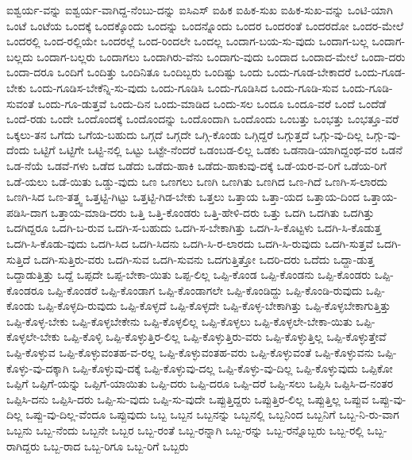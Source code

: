{ಐಶ್ವರ್ಯ-ವನ್ನು
ಐಶ್ವರ್ಯ-ವಾಗಿದ್ದ-ನೆಂಬು-ದನ್ನು
ಐಸಿಎಸ್
ಐಹಿಕ
ಐಹಿಕ-ಸುಖ
ಐಹಿಕ-ಸುಖ-ವನ್ನು
ಒಂಟಿ-ಯಾಗಿ
ಒಂಟೆ
ಒಂಟೆಯ
ಒಂದಕ್ಕೆ
ಒಂದಕ್ಕೊಂದು
ಒಂದನ್ನು
ಒಂದನ್ನೊಂದು
ಒಂದರ
ಒಂದರಂತೆ
ಒಂದರದೋ
ಒಂದರ-ಮೇಲೆ
ಒಂದರಲ್ಲಿ
ಒಂದ-ರಲ್ಲಿಯೇ
ಒಂದರಲ್ಲೆ
ಒಂದ-ರಿಂದಲೇ
ಒಂದಲ್ಲ
ಒಂದಾಗ-ಬಯ-ಸು-ವುದು
ಒಂದಾಗ-ಬಲ್ಲ
ಒಂದಾಗ-ಬಲ್ಲದು
ಒಂದಾಗ-ಬಲ್ಲರು
ಒಂದಾಗಲು
ಒಂದಾಗಿರು-ವೆನು
ಒಂದಾಗು-ವುದು
ಒಂದಾದ
ಒಂದಾದ-ಮೇಲೆ
ಒಂದಾ-ದರು
ಒಂದಾ-ದರೂ
ಒಂದಿಗೆ
ಒಂದಿತ್ತು
ಒಂದಿನಿತೂ
ಒಂದಿಬ್ಬರು
ಒಂದಿಷ್ಟು
ಒಂದು
ಒಂದು-ಗೂಡ-ಬೇಕಾದರೆ
ಒಂದು-ಗೂಡ-ಬೇಕು
ಒಂದು-ಗೂಡಿಸ-ಬೇಕೆನ್ನಿ-ಸು-ವುದು
ಒಂದು-ಗೂಡಿಸಿ
ಒಂದು-ಗೂಡಿಸಿದ
ಒಂದು-ಗೂಡಿ-ಸುವ
ಒಂದು-ಗೂಡಿ-ಸುವಂತೆ
ಒಂದು-ಗೂ-ಡುತ್ತವೆ
ಒಂದು-ದಿನ
ಒಂದು-ಮಾಡಿದ
ಒಂದು-ಸಲ
ಒಂದೂ
ಒಂದೂ-ವರೆ
ಒಂದೆ
ಒಂದೆಡೆ
ಒಂದೆ-ರಡು
ಒಂದೇ
ಒಂದೊಂದಕ್ಕೆ
ಒಂದೊಂದನ್ನು
ಒಂದೊಂದಾಗಿ
ಒಂದೊಂದು
ಒಂಬತ್ತು
ಒಂಭತ್ತು
ಒಂಭತ್ತೂ-ವರೆ
ಒಕ್ಕಲು-ತನ
ಒಗೆದು
ಒಗೆಯ-ಬಹುದು
ಒಗ್ಗದೆ
ಒಗ್ಗದೇ
ಒಗ್ಗಿ-ಕೊಂಡು
ಒಗ್ಗಿದ್ದರೆ
ಒಗ್ಗುತ್ತದೆ
ಒಗ್ಗು-ವು-ದಿಲ್ಲ
ಒಗ್ಗು-ವು-ದೆಂದು
ಒಟ್ಟಿಗೆ
ಒಟ್ಟಿಗೇ
ಒಟ್ಟಿ-ನಲ್ಲಿ
ಒಟ್ಟು
ಒಟ್ಟೇ-ನೆಂದರೆ
ಒಡಂಬಡ-ಲಿಲ್ಲ
ಒಡಕು
ಒಡನಾಡಿ-ಯಾಗಿದ್ದಂಥ-ವರ
ಒಡನೆ
ಒಡ-ನೆಯೆ
ಒಡವೆ-ಗಳು
ಒಡೆದ
ಒಡೆದು
ಒಡೆದು-ಹಾಕಿ
ಒಡೆದು-ಹಾಕುವು-ದಕ್ಕೆ
ಒಡೆ-ಯರ-ವ-ರಿಗೆ
ಒಡೆಯ-ರಿಗೆ
ಒಡೆ-ಯಲು
ಒಡೆ-ಯಿತು
ಒಡ್ಡು-ವುದು
ಒಣ
ಒಣಗಲು
ಒಣಗಿ
ಒಣಗಿತು
ಒಣಗಿದ
ಒಣ-ಗಿದೆ
ಒಣಗಿ-ಸ-ಲಾರದು
ಒಣಗಿ-ಸಿದ
ಒಣ-ತತ್ತ್ವ
ಒತ್ತಟ್ಟಿ-ಗಿಟ್ಟು
ಒತ್ತಟ್ಟಿ-ಗಿಡ-ಬೇಕು
ಒತ್ತಲು
ಒತ್ತಾಯ
ಒತ್ತಾ-ಯದ
ಒತ್ತಾಯ-ದಿಂದ
ಒತ್ತಾಯ-ಪಡಿಸಿ-ದಾಗ
ಒತ್ತಾಯ-ಮಾಡಿ-ದರು
ಒತ್ತಿ
ಒತ್ತಿ-ಕೊಂಡರು
ಒತ್ತಿ-ಹೇಳಿ-ದರು
ಒತ್ತು
ಒದಗಿ
ಒದಗಿತು
ಒದಗಿತ್ತು
ಒದಗಿದ್ದರೂ
ಒದಗಿ-ಬ-ರುವ
ಒದಗಿ-ಸ-ಬಹುದು
ಒದಗಿ-ಸ-ಬೇಕಾಗಿತ್ತು
ಒದಗಿ-ಸಿ-ಕೊಟ್ಟಳು
ಒದಗಿ-ಸಿ-ಕೊಡುತ್ತ
ಒದಗಿ-ಸಿ-ಕೊಡು-ವುದು
ಒದಗಿ-ಸಿದ
ಒದಗಿ-ಸಿದನು
ಒದಗಿ-ಸಿ-ರ-ಲಾರದು
ಒದಗಿ-ಸಿ-ರುವುದು
ಒದಗಿ-ಸುತ್ತವೆ
ಒದಗಿ-ಸುತ್ತಿದೆ
ಒದಗಿ-ಸುತ್ತಿರು-ವರು
ಒದಗಿ-ಸುವ
ಒದಗಿ-ಸುವನು
ಒದಗುತ್ತಿತ್ತೋ
ಒದರಿ-ದರು
ಒದೆದು
ಒದ್ದಾ-ಡುತ್ತ
ಒದ್ದಾಡುತ್ತಿತ್ತು
ಒದ್ದೆ
ಒಪ್ಪದೇ
ಒಪ್ಪ-ಬೇಕಾ-ಯಿತು
ಒಪ್ಪ-ಲಿಲ್ಲ
ಒಪ್ಪಿ-ಕೊಂಡ
ಒಪ್ಪಿ-ಕೊಂಡನು
ಒಪ್ಪಿ-ಕೊಂಡರು
ಒಪ್ಪಿ-ಕೊಂಡರೂ
ಒಪ್ಪಿ-ಕೊಂಡರೆ
ಒಪ್ಪಿ-ಕೊಂಡಾಗ
ಒಪ್ಪಿ-ಕೊಂಡಾಗಲೇ
ಒಪ್ಪಿ-ಕೊಂಡಿದ್ದು
ಒಪ್ಪಿ-ಕೊಂಡಿ-ರುವುದು
ಒಪ್ಪಿ-ಕೊಂಡು
ಒಪ್ಪಿ-ಕೊಳ್ಳದಿ-ರುವುದು
ಒಪ್ಪಿ-ಕೊಳ್ಳದೆ
ಒಪ್ಪಿ-ಕೊಳ್ಳದೇ
ಒಪ್ಪಿ-ಕೊಳ್ಳ-ಬೇಕಾಗಿತ್ತು
ಒಪ್ಪಿ-ಕೊಳ್ಳಬೇಕಾಗುತ್ತಿತ್ತು
ಒಪ್ಪಿ-ಕೊಳ್ಳ-ಬೇಕು
ಒಪ್ಪಿ-ಕೊಳ್ಳಬೇಕೇನು
ಒಪ್ಪಿ-ಕೊಳ್ಳಲಿಲ್ಲ
ಒಪ್ಪಿ-ಕೊಳ್ಳಲು
ಒಪ್ಪಿ-ಕೊಳ್ಳಲೇ-ಬೇಕಾ-ಯಿತು
ಒಪ್ಪಿ-ಕೊಳ್ಳಲೇ-ಬೇಕು
ಒಪ್ಪಿ-ಕೊಳ್ಳಿ
ಒಪ್ಪಿ-ಕೊಳ್ಳುತ್ತಿರ-ಲಿಲ್ಲ
ಒಪ್ಪಿ-ಕೊಳ್ಳುತ್ತಿರು-ವರು
ಒಪ್ಪಿ-ಕೊಳ್ಳುತ್ತಿಲ್ಲ
ಒಪ್ಪಿ-ಕೊಳ್ಳುತ್ತೇವೆ
ಒಪ್ಪಿ-ಕೊಳ್ಳುವ
ಒಪ್ಪಿ-ಕೊಳ್ಳುವಂತಹ-ವ-ರಲ್ಲ
ಒಪ್ಪಿ-ಕೊಳ್ಳುವಂತಹ-ವರು
ಒಪ್ಪಿ-ಕೊಳ್ಳುವಂತೆ
ಒಪ್ಪಿ-ಕೊಳ್ಳುವನು
ಒಪ್ಪಿ-ಕೊಳ್ಳು-ವು-ದಕ್ಕಾಗಿ
ಒಪ್ಪಿ-ಕೊಳ್ಳುವು-ದಕ್ಕೆ
ಒಪ್ಪಿ-ಕೊಳ್ಳುವು-ದಲ್ಲ
ಒಪ್ಪಿ-ಕೊಳ್ಳು-ವು-ದಿಲ್ಲ
ಒಪ್ಪಿ-ಕೊಳ್ಳುವುದು
ಒಪ್ಪಿಕೋ
ಒಪ್ಪಿಗೆ
ಒಪ್ಪಿಗೆ-ಯನ್ನು
ಒಪ್ಪಿಗೆ-ಯಾಯಿತು
ಒಪ್ಪಿ-ದರು
ಒಪ್ಪಿ-ದರೂ
ಒಪ್ಪಿ-ದರೆ
ಒಪ್ಪಿ-ಸಲು
ಒಪ್ಪಿಸಿ
ಒಪ್ಪಿಸಿ-ದ-ನಂತರ
ಒಪ್ಪಿಸಿ-ದನು
ಒಪ್ಪಿಸಿ-ದರು
ಒಪ್ಪಿ-ಸು-ವುದು
ಒಪ್ಪಿ-ಸು-ವುದೇ
ಒಪ್ಪುತ್ತಿದ್ದರು
ಒಪ್ಪುತ್ತಿರ-ಲಿಲ್ಲ
ಒಪ್ಪುತ್ತಿಲ್ಲ
ಒಪ್ಪುವ
ಒಪ್ಪು-ವು-ದಿಲ್ಲ
ಒಪ್ಪು-ವು-ದಿಲ್ಲ-ವೆಂದೂ
ಒಪ್ಪುವುದು
ಒಬ್ಬ
ಒಬ್ಬನ
ಒಬ್ಬನನ್ನು
ಒಬ್ಬನಲ್ಲಿ
ಒಬ್ಬನಿಂದ
ಒಬ್ಬನಿಗೆ
ಒಬ್ಬ-ನಿ-ರು-ವಾಗ
ಒಬ್ಬನು
ಒಬ್ಬ-ನೆಂದು
ಒಬ್ಬನೇ
ಒಬ್ಬರ
ಒಬ್ಬ-ರಂತೆ
ಒಬ್ಬ-ರನ್ನಾಗಿ
ಒಬ್ಬ-ರನ್ನು
ಒಬ್ಬ-ರನ್ನೊಬ್ಬರು
ಒಬ್ಬ-ರಲ್ಲಿ
ಒಬ್ಬ-ರಾಗಿದ್ದರು
ಒಬ್ಬ-ರಾದ
ಒಬ್ಬ-ರಿಗೂ
ಒಬ್ಬ-ರಿಗೆ
ಒಬ್ಬರು
}
